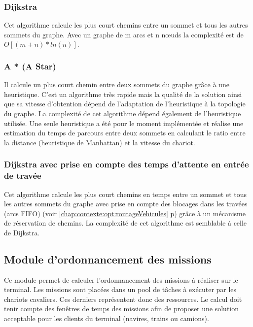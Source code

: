 \subsubsection{Dijkstra}

Cet algorithme calcule les plus court chemins entre un sommet et tous les autres sommets du graphe. Avec un graphe de m arcs et n n\oe{}uds la complexité est de $O[(m+n)*ln(n)]$.

\subsubsection{A * (A Star)}

Il calcule un plus court chemin entre deux sommets du graphe grâce à une heuristique. C'est un algorithme très rapide mais la qualité de la solution ainsi que sa vitesse d'obtention dépend de l'adaptation de l'heuristique à la topologie du graphe. La complexité de cet algorithme dépend également de l'heuristique utilisée. 
Une seule heuristique a été pour le moment implémentée et réalise une estimation du temps de parcours entre deux sommets en calculant le ratio entre la distance (heuristique de Manhattan) et la vitesse du chariot.

\subsubsection{Dijkstra avec prise en compte des temps d'attente en entrée de travée}

Cet algorithme calcule les plus court chemins en temps entre un sommet et tous les autres sommets du graphe avec prise en compte des blocages dans les travées (arcs FIFO) (voir \ref{chap:contexte:opt:routageVehicules} p\pageref{chap:contexte:opt:routageVehicules}) grâce à un mécanisme de réservation de chemins. La complexité de cet algorithme est semblable à celle de Dijkstra.

\subsection{Module d'ordonnancement des missions}

Ce module permet de calculer l'ordonnancement des missions à réaliser sur le terminal. Les missions sont placées dans un pool de tâches à exécuter par les chariots cavaliers. Ces derniers représentent donc des ressources. Le calcul doit tenir compte des fenêtres de temps des missions afin de proposer une solution acceptable pour les clients du terminal (navires, trains ou camions).

